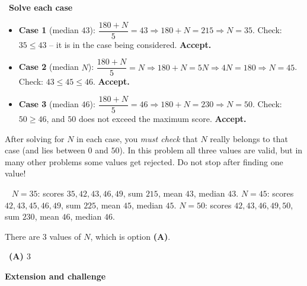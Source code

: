 \documentclass[11pt]{article}
\providecommand{\AnsWord}{Đáp số}
\newcommand{\ans}[1]{\par\smallskip{\bfseries\color{tmGreen!88!black}\AnsWord:}\ {\bfseries\color{AnsRed}#1}\par}
\newcommand{\dividerbar}[1]{\par\vspace{0.6em}\noindent
  \begin{tcolorbox}[enhanced,frame hidden,interior hidden,borderline west={5pt}{0pt}{ProbBlue},
    colback=white,left=12pt,right=12pt,top=5pt,bottom=5pt,arc=4pt]
  {\large\bfseries\color{ProbBlue} #1}\end{tcolorbox}\vspace{0.4em}}
\newcommand{\step}[2]{\par\smallskip\noindent{\bfseries\color{tmBlue!85!black}\StepWord~#1.}\ {\bfseries #2}\par\nopagebreak}
\newcommand{\verify}[1]{\par\smallskip\noindent{\bfseries\color{tmGreen!80!black}\faCheckCircle\ \CheckWord}\ #1\par}
\def\AnsWord{Answer}
\def\StepWord{Step}
\def\CheckWord{Check:}
\begin{document}
{\step{3}{Solve each case}
\begin{itemize}[leftmargin=1.4em,itemsep=1pt]
\item \textbf{Case 1} (median $43$): $\dfrac{180+N}{5}=43\Rightarrow 180+N=215\Rightarrow N=35$. Check: $35\le 43$ -- it is in the case being considered. \textbf{Accept.}
\item \textbf{Case 2} (median $N$): $\dfrac{180+N}{5}=N\Rightarrow 180+N=5N\Rightarrow 4N=180\Rightarrow N=45$. Check: $43\le 45\le 46$. \textbf{Accept.}
\item \textbf{Case 3} (median $46$): $\dfrac{180+N}{5}=46\Rightarrow 180+N=230\Rightarrow N=50$. Check: $50\ge 46$, and $50$ does not exceed the maximum score. \textbf{Accept.}
\end{itemize}

\begin{warnbox}After solving for $N$ in each case, you \emph{must check} that $N$ really belongs to that case (and lies between $0$ and $50$). In this problem all three values are valid, but in many other problems some values get rejected. Do not stop after finding one value!\end{warnbox}

\verify{
$N=35$: scores $35,42,43,46,49$, sum $215$, mean $43$, median $43$.
$N=45$: scores $42,43,45,46,49$, sum $225$, mean $45$, median $45$.
$N=50$: scores $42,43,46,49,50$, sum $230$, mean $46$, median $46$.}
There are $3$ values of $N$, which is option \textbf{(A)}.
\ans{(A) $3$}
}

\clearpage
\dividerbar{Extension and challenge}

\end{document}
